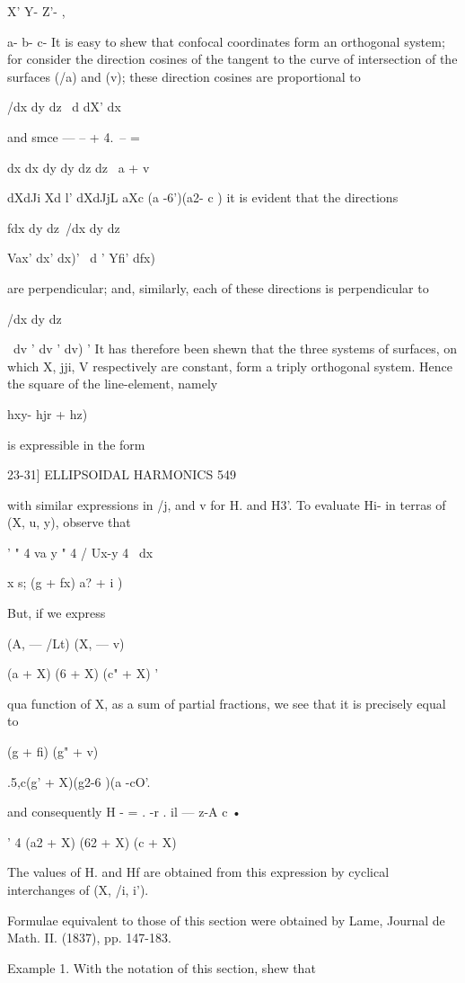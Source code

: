 {{X' Y- Z'- ,

a- b- c- It is easy to shew that confocal coordinates form an
orthogonal system; for consider the direction cosines of the tangent
to the curve of intersection of the surfaces (/a) and (v); these
direction cosines are proportional to

/dx dy dz \ d dX' dx

and smce — -- + 4.\ -- = %

dx dx dy dy dz dz \ a + v

dXdJi Xd l' dXdJjL aXc (a -6')(a2- c ) it is evident that the
directions

fdx dy dz\ /dx dy dz\

Vax' dx' dx)' \ d ' Yfi' dfx)

are perpendicular; and, similarly, each of these directions is
perpendicular to

/dx dy dz\

\ dv ' dv ' dv) ' It has therefore been shewn that the three systems
of surfaces, on which X, jji, V respectively are constant, form a
triply orthogonal system. Hence the square of the line-element, namely

 hxy- hjr + hz)\

is expressible in the form

23-31] ELLIPSOIDAL HARMONICS 549

with similar expressions in /j, and v for H. and H3'. To evaluate Hi-
in terras of (X, u, y), observe that

' " 4 va y " 4 / Ux-y 4 \ dx

 x s; (g + fx) a? + i )

But, if we express

(A, — /Lt) (X, — v)

(a + X) (6 + X) (c" + X) '

qua function of X, as a sum of partial fractions, we see that it is
precisely equal to

  (g + fi) (g" + v)

 .5,c(g' + X)(g2-6 )(a -cO'.

and consequently H - = . -r . il — z-A c •

  ' 4 (a2 + X) (62 + X) (c + X)

The values of H. and Hf are obtained from this expression by cyclical
interchanges of (X, /i, i').

Formulae equivalent to those of this section were obtained by Lame,
Journal de Math. II. (1837), pp. 147-183.

Example 1. With the notation of this section, shew that

}}

